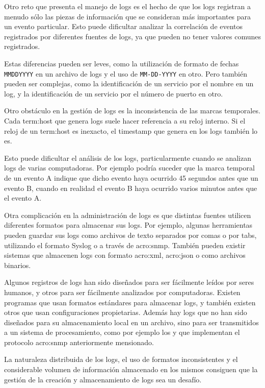Otro reto que presenta el manejo de logs es el hecho de que los logs registran
a menudo sólo las piezas de información que se consideran más importantes para
un evento particular. Esto puede dificultar analizar la correlación de
eventos registrados por diferentes fuentes de logs, ya que pueden no tener
valores comunes registrados.

Estas diferencias pueden ser leves, como la utilización de formato de fechas
\texttt{MMDDYYYY} en un archivo de logs y el uso de \texttt{MM-DD-YYYY} en
otro. Pero también pueden ser complejas, como la identificación de un servicio
por el nombre en un log, y la identificación de un servicio por el número de
puerto en otro.

Otro obstáculo en la gestión de logs es la inconsistencia de las marcas
temporales. Cada \gls{term:host} que genera logs suele hacer referencia a su reloj
interno. Si el reloj de un \gls{term:host} es inexacto, el timestamp que genera en los
logs también lo es.

Esto puede dificultar el análisis de los logs, particularmente cuando se
analizan logs de varias computadoras. Por ejemplo podría suceder que la marca
temporal de un evento A indique que dicho evento haya ocurrido 45 segundos
antes que un evento B, cuando en realidad el evento B haya ocurrido varios
minutos antes que el evento A.

Otra complicación en la administración de logs es que distintas fuentes
utilicen diferentes formatos para almacenar sus logs. Por ejemplo, algunas
herramientas pueden guardar sus logs como archivos de texto separados por comas
o por tabs, utilizando el formato Syslog o a través de \gls{acro:snmp}. También
pueden existir sistemas que almacenen logs con formato \gls{acro:xml},
\gls{acro:json} o como archivos binarios.

Algunos registros de logs han sido diseñados para ser fácilmente leídos por
seres humanos, y otros para ser fácilmente analizados por computadoras. Existen
programas que usan formatos estándares para almacenar logs, y también existen
otros que usan configuraciones propietarias. Además hay logs que no han sido
diseñados para su almacenamiento local en un archivo, sino para ser
transmitidos a un sistema de procesamiento, como por ejemplo los 
y  que implementan el protocolo
\gls{acro:snmp}\cite[p.~23]{monitoreo:log_management_guide} anteriormente
mensionado.

La naturaleza distribuida de los logs, el uso de formatos inconsistentes y el
considerable volumen de información almacenado en los mismos consiguen que la
gestión de la creación y almacenamiento de logs sea un desafío.

